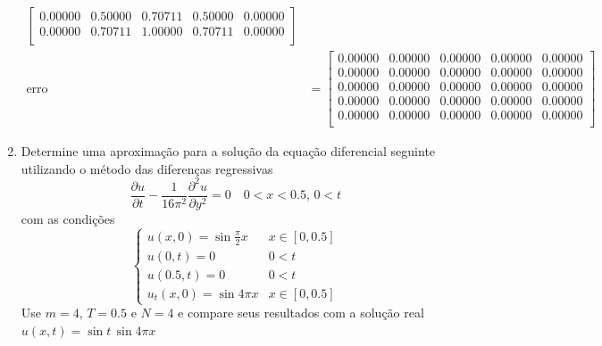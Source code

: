 \documentclass[a4paper, 11pt]{report}
\begin{document}
\begin{enumerate}[leftmargin=*]
\begin{minipage}{0.6\columnwidth}
\begin{align*}
\begin{bmatrix}
                0.00000 &  0.50000 &  0.70711 &   0.50000 &  0.00000\\  
                0.00000 &  0.70711 &  1.00000 &   0.70711 &  0.00000\\
            \end{bmatrix}\\
            \text{erro} &= 
            \begin{bmatrix}
                0.00000 & 0.00000 &  0.00000 &  0.00000 &  0.00000\\  
                0.00000 & 0.00000 &  0.00000 &  0.00000 &  0.00000\\  
                0.00000 & 0.00000 &  0.00000 &  0.00000 &  0.00000\\  
                0.00000 & 0.00000 &  0.00000 &  0.00000 &  0.00000\\  
                0.00000 & 0.00000 &  0.00000 &  0.00000 &  0.00000\\  
            \end{bmatrix}
        \end{align*}
    \end{minipage}
    \item Determine uma aproximação para a solução da equação diferencial seguinte utilizando o método das diferenças regressivas
    \[
    \dfrac{\partial u}{\partial t} - \frac{1}{16\pi^2}\dfrac{\partial^2 u}{\partial y^2} = 0 \quad 0 < x < 0.5, \, 0 < t
    \]
    com as condições
    \[
        \left\{  
            \begin{array}{ll}
                u(x,0) = \sin \frac{\pi}{2} x & x \in [0,0.5]\\  
                u(0,t) = 0 & 0 < t\\
                u(0.5,t) = 0 & 0 < t\\
                u_t(x,0) = \sin 4 \pi x & x \in [0,0.5]
            \end{array}
        \right.
    \]
    Use $m = 4$, $T = 0.5$ e $N = 4$ e compare seus resultados com a solução real $u(x,t) = \sin t \, \sin 4\pi x$
    

\end{enumerate}
\end{document}
